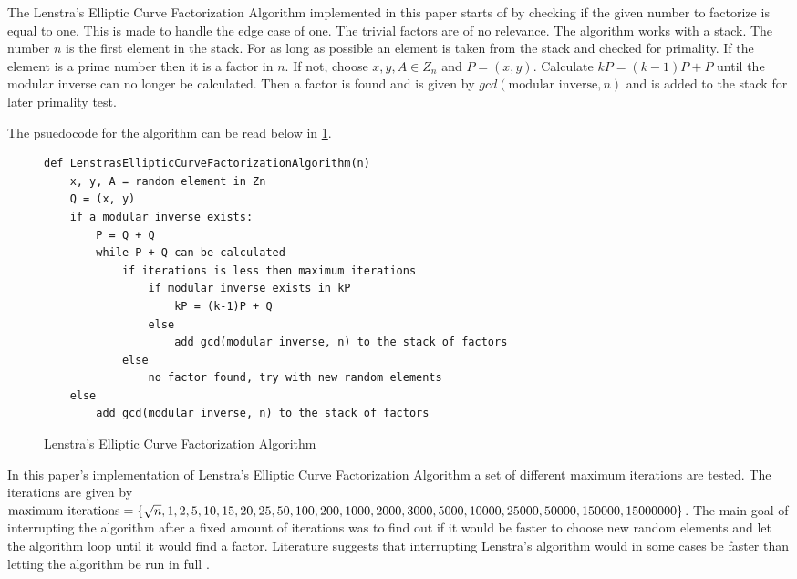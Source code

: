 The Lenstra's Elliptic Curve Factorization Algorithm implemented in this paper starts of by checking if the given number to factorize is equal to one. This is made to handle the edge case of one. The trivial factors are of no relevance. The algorithm works with a stack. The number $n$ is the first element in the stack. For as long as possible an element is taken from the stack and checked for primality. If the element is a prime number then it is a factor in $n$. If not, choose $x, y, A \in Z_n$ and $P= (x, y)$. Calculate $kP = (k-1)P + P$ until the modular inverse can no longer be calculated. Then a factor is found and is given by $gcd(\text{modular inverse}, n)$ and is added to the stack for later primality test. 

The psuedocode for the algorithm can be read below in \ref{fig:LenstrasEllipticCurveFactorizationAlgorithm}.
\begin{figure}[H]
    \centering
    \begin{minipage}{0.5\textwidth}
        \begin{verbatim}
def LenstrasEllipticCurveFactorizationAlgorithm(n)
    x, y, A = random element in Zn
    Q = (x, y)
    if a modular inverse exists:
        P = Q + Q
        while P + Q can be calculated 
            if iterations is less then maximum iterations
                if modular inverse exists in kP
                    kP = (k-1)P + Q
                else
                    add gcd(modular inverse, n) to the stack of factors
            else
                no factor found, try with new random elements
    else
        add gcd(modular inverse, n) to the stack of factors
        \end{verbatim}
    \end{minipage}
     \caption{Lenstra's Elliptic Curve Factorization Algorithm}
    \label{fig:LenstrasEllipticCurveFactorizationAlgorithm}      
 \end{figure}
 
 In this paper's implementation of Lenstra's Elliptic Curve Factorization Algorithm a set of different maximum iterations are tested. The iterations are given by $\text{maximum iterations} = \{\sqrt{n}, 1, 2, 5, 10, 15, 20, 25, 50, 100, 200, 1000, 2000, 3000,\\ 5000, 10000, 25000, 50000, 150000, 15000000\}$. The main goal of interrupting the algorithm after a fixed amount of iterations was to find out if it would be faster to choose new random elements and let the algorithm loop until it would find a factor. Literature suggests that interrupting Lenstra's algorithm would in some cases be faster than letting the algorithm be run in full \cite{LenstrasFactorizationAlgorithm}.
